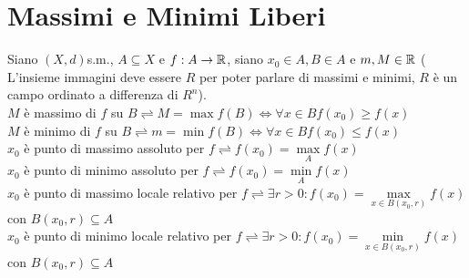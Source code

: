 \section{Massimi e Minimi Liberi}
Siano $(X,d)$s.m., $A\subseteq X$ e $f:A\rightarrow \mathbb{R}$, siano $x_0\in A, B\in A$ e $m,M\in \mathbb{R}$ ( L'insieme immagini deve essere $R$ per poter parlare di massimi e minimi, $R$ è un campo ordinato a differenza di $R^n$).\\
$M$ è massimo di $f$ su $B \rightleftharpoons M=\max f(B)\Leftrightarrow\forall x \in B f(x_0)\ge f(x)$\\
$M$ è minimo di $f$ su $B \rightleftharpoons m=\min f(B)\Leftrightarrow\forall x \in B f(x_0)\le f(x)$\\
$x_0$ è punto di massimo assoluto per $f \rightleftharpoons f(x_0)=\max\limits_{A}f(x)$\\
$x_0$ è punto di minimo assoluto per $f \rightleftharpoons f(x_0)=\min\limits_{A}f(x)$\\
$x_0$ è punto di massimo locale relativo per $f \rightleftharpoons \exists r>0: f(x_0)=\max\limits_{x\in B(x_0,r)}f(x)$ con $B(x_0,r)\subseteq A$\\
$x_0$ è punto di minimo locale relativo per $f \rightleftharpoons \exists r>0: f(x_0)=\min\limits_{x\in B(x_0,r)}f(x)$ con $B(x_0,r)\subseteq A$\\
